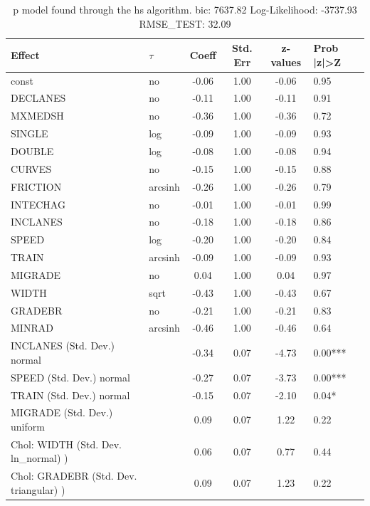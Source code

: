 \begin{table}
	\caption{p model found through the hs algorithm. bic: 7637.82 Log-Likelihood: -3737.93 RMSE_TEST: 32.09}
	\begin{center}
		\begin{tabular}{|l|l|c|c|c|l|}
			\hline
			Effect & $\tau$ & Coeff & Std. Err & z-values & Prob |z|>Z \\
			\hline
			const & no & -0.06 & 1.00 & -0.06 & 0.95 \\
			\hline
			DECLANES & no & -0.11 & 1.00 & -0.11 & 0.91 \\
			\hline
			MXMEDSH & no & -0.36 & 1.00 & -0.36 & 0.72 \\
			\hline
			SINGLE & log & -0.09 & 1.00 & -0.09 & 0.93 \\
			\hline
			DOUBLE & log & -0.08 & 1.00 & -0.08 & 0.94 \\
			\hline
			CURVES & no & -0.15 & 1.00 & -0.15 & 0.88 \\
			\hline
			FRICTION & arcsinh & -0.26 & 1.00 & -0.26 & 0.79 \\
			\hline
			INTECHAG & no & -0.01 & 1.00 & -0.01 & 0.99 \\
			\hline
			INCLANES & no & -0.18 & 1.00 & -0.18 & 0.86 \\
			\hline
			SPEED & log & -0.20 & 1.00 & -0.20 & 0.84 \\
			\hline
			TRAIN & arcsinh & -0.09 & 1.00 & -0.09 & 0.93 \\
			\hline
			MIGRADE & no & 0.04 & 1.00 & 0.04 & 0.97 \\
			\hline
			WIDTH & sqrt & -0.43 & 1.00 & -0.43 & 0.67 \\
			\hline
			GRADEBR & no & -0.21 & 1.00 & -0.21 & 0.83 \\
			\hline
			MINRAD & arcsinh & -0.46 & 1.00 & -0.46 & 0.64 \\
			\hline
			INCLANES (Std. Dev.) normal &  & -0.34 & 0.07 & -4.73 & 0.00*** \\
			\hline
			SPEED (Std. Dev.) normal &  & -0.27 & 0.07 & -3.73 & 0.00*** \\
			\hline
			TRAIN (Std. Dev.) normal &  & -0.15 & 0.07 & -2.10 & 0.04* \\
			\hline
			MIGRADE (Std. Dev.) uniform &  & 0.09 & 0.07 & 1.22 & 0.22 \\
			\hline
			 Chol: WIDTH (Std. Dev. ln_normal) ) &  & 0.06 & 0.07 & 0.77 & 0.44 \\
			\hline
			 Chol: GRADEBR (Std. Dev. triangular) ) &  & 0.09 & 0.07 & 1.23 & 0.22 \\

\end{tabular}
\end{center}
\end{table}
